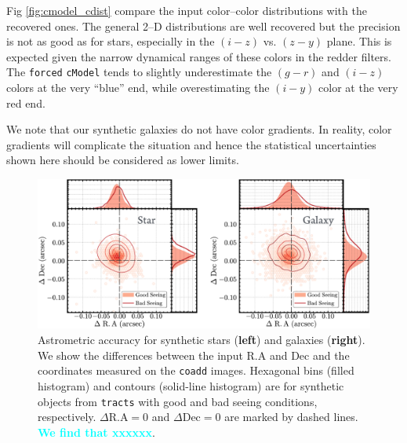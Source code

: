 \documentclass[useamsfonts]{pasj01}
\def\cmodel{\texttt{cModel}}
\def\forced{\texttt{forced}}
\def\coadd{\texttt{coadd}}
\def\tracts{\texttt{tracts}}
\newcommand{\song}[1]{\textcolor{cyan} {\textbf{#1}}}
\begin{document}
    Fig \ref{fig:cmodel_cdist} compare the input color--color distributions with the
    recovered ones. 
    The general 2--D distributions are well recovered but the precision is not as 
    good as for stars, especially in the $(i-z)$ vs. $(z-y)$ plane.
    This is expected given the narrow dynamical ranges of these colors in the redder 
    filters.
    The \forced{} \cmodel{} tends to slightly underestimate the $(g-r)$ and $(i-z)$
    colors at the very ``blue'' end, while overestimating the $(i-y)$ color at the very
    red end.

    We note that our synthetic galaxies do not have color gradients.  
    In reality, color gradients will complicate the situation and hence the statistical 
    uncertainties shown here should be considered as lower limits.
    


\begin{figure}
    \begin{center}
        \includegraphics[width=\textwidth]{fig/synpipe_astrometry}
    \end{center}
    \caption{
        Astrometric accuracy for synthetic stars (\textbf{left}) and galaxies
        (\textbf{right}). 
        We show the differences between the input R.A and Dec and the coordinates 
        measured on the \coadd{} images. 
        Hexagonal bins (filled histogram) and contours (solid-line histogram) are 
        for synthetic objects from \tracts{} with good and bad seeing conditions, 
        respectively.
        $\Delta\mathrm{R.A}=0$ and $\Delta\mathrm{Dec}=0$ are marked by dashed lines.     
        \song{We find that xxxxxx}.
        }
    \label{fig:astrometry}
\end{figure}
\end{document}
